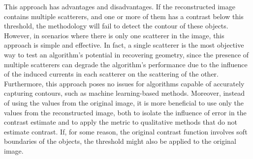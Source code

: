 \documentclass{IEEEtran}
\begin{document}
			This approach has advantages and disadvantages. If the reconstructed image contains multiple scatterers, and one or more of them has a contrast below this threshold, the methodology will fail to detect the contour of these objects. However, in scenarios where there is only one scatterer in the image, this approach is simple and effective. In fact, a single scatterer is the most objective way to test an algorithm's potential in recovering geometry, since the presence of multiple scatterers can degrade the algorithm's performance due to the influence of the induced currents in each scatterer on the scattering of the other. Furthermore, this approach poses no issues for algorithms capable of accurately capturing contours, such as machine learning-based methods. Moreover, instead of using the values from the original image, it is more beneficial to use only the values from the reconstructed image, both to isolate the influence of error in the contrast estimate and to apply the metric to qualitative methods that do not estimate contrast. If, for some reason, the original contrast function involves soft boundaries of the objects, the threshold might also be applied to the original image.
			
			
\end{document}
